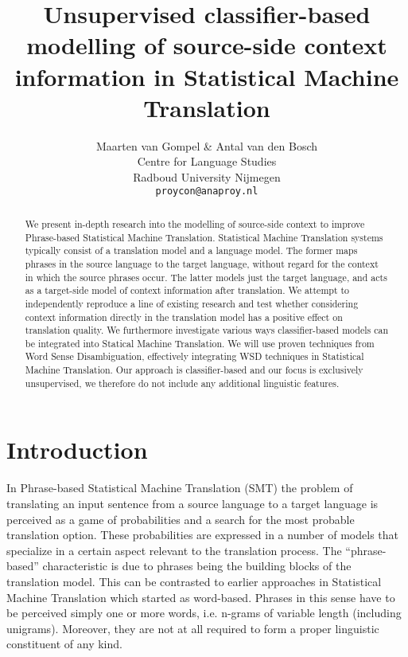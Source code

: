 \documentclass[11pt]{article}
\title{Unsupervised classifier-based modelling of source-side context information in Statistical Machine Translation}
\author{Maarten van Gompel \& Antal van den Bosch \\
 Centre for Language Studies \\
  Radboud University Nijmegen \\
  {\tt proycon@anaproy.nl}}
\theoremstyle{break}
\begin{document}
\maketitle

\begin{abstract} 
We present in-depth research into the modelling of source-side
context to improve Phrase-based Statistical Machine Translation. Statistical
Machine Translation systems typically consist of a translation model and a
language model. The former maps phrases in the source language to the target
language, without regard for the context in which the source phrases occur. The
latter models just the target language, and acts as a target-side model of
context information after translation. We attempt to independently reproduce a
line of existing research and test whether considering context information
directly in the translation model has a positive effect on translation quality.
We furthermore investigate various ways classifier-based models can be
integrated into Statical Machine Translation.  We will use proven techniques
from Word Sense Disambiguation, effectively integrating WSD techniques in
Statistical Machine Translation. Our approach is classifier-based and our focus
is exclusively unsupervised, we therefore do not include any additional linguistic
features. 
\end{abstract}

\section{Introduction}

In Phrase-based Statistical Machine Translation (SMT) the problem of
translating an input sentence from a source language to a target language is
perceived as a game of probabilities and a search for the most probable
translation option.  These probabilities are expressed in a number of models
that specialize in a certain aspect relevant to the translation process. The
``phrase-based'' characteristic is due to phrases being the building blocks of
the translation model. This can be contrasted to earlier approaches in
Statistical Machine Translation which started as word-based.  Phrases in this
sense have to be perceived simply one or more words, i.e.  n-grams of variable
length (including unigrams). Moreover, they are not at all required to form a
proper linguistic constituent of any kind.
\end{document}
